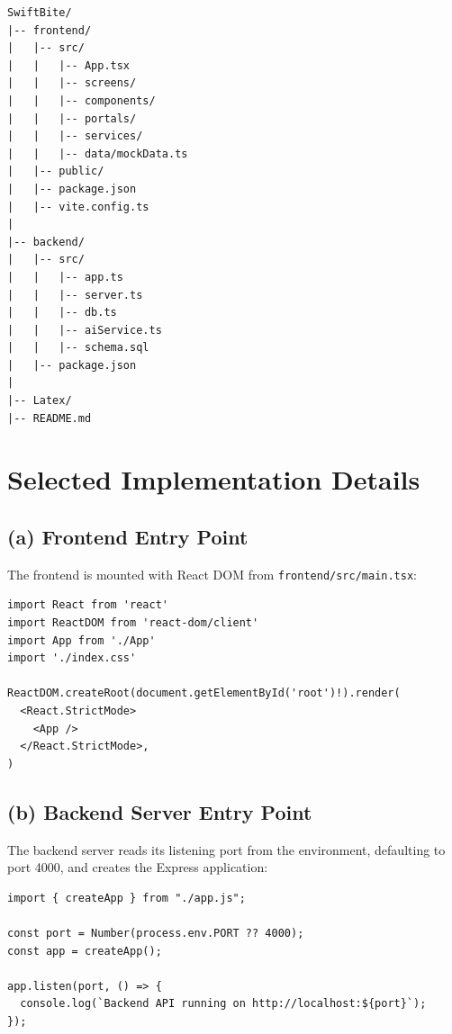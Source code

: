 \begin{verbatim}
SwiftBite/
|-- frontend/
|   |-- src/
|   |   |-- App.tsx
|   |   |-- screens/
|   |   |-- components/
|   |   |-- portals/
|   |   |-- services/
|   |   |-- data/mockData.ts
|   |-- public/
|   |-- package.json
|   |-- vite.config.ts
|
|-- backend/
|   |-- src/
|   |   |-- app.ts
|   |   |-- server.ts
|   |   |-- db.ts
|   |   |-- aiService.ts
|   |   |-- schema.sql
|   |-- package.json
|
|-- Latex/
|-- README.md
\end{verbatim}

\section{Selected Implementation Details}

\subsection*{(a) Frontend Entry Point}

The frontend is mounted with React DOM from \texttt{frontend/src/main.tsx}:

\begin{tcolorbox}[colback=gray!5,colframe=black,title=React Application Entry]
\begin{verbatim}
import React from 'react'
import ReactDOM from 'react-dom/client'
import App from './App'
import './index.css'

ReactDOM.createRoot(document.getElementById('root')!).render(
  <React.StrictMode>
    <App />
  </React.StrictMode>,
)
\end{verbatim}
\end{tcolorbox}

\subsection*{(b) Backend Server Entry Point}

The backend server reads its listening port from the environment, defaulting to port 4000, and creates the Express application:

\begin{tcolorbox}[colback=gray!5,colframe=black,title=Express Server Entry]
\begin{verbatim}
import { createApp } from "./app.js";

const port = Number(process.env.PORT ?? 4000);
const app = createApp();

app.listen(port, () => {
  console.log(`Backend API running on http://localhost:${port}`);
});
\end{verbatim}
\end{tcolorbox}


